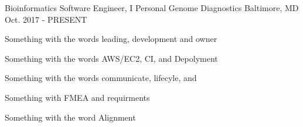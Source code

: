 

\begin{cventries}

  \cventry
    {Bioinformatics Software Engineer, I} %
    {Personal Genome Diagnostics} %
    {Baltimore, MD} %
    {Oct. 2017 - PRESENT} %
    {
      \begin{cvitems} %
        \item{Something with the words leading, development and owner }
        \item{Something with the words AWS/EC2, CI, and Depolyment}
        \item{Something with the words communicate, lifecyle, and }
        \item{Something with FMEA and requirments}
        \item{Something with the word Alignment}
      \end{cvitems}
    }


\end{cventries}
